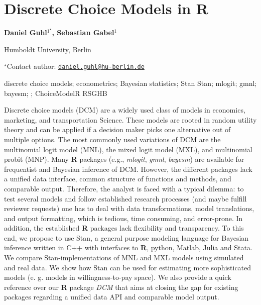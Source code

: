 \documentclass[\main/boa.tex]{subfiles}
\begin{document}
\section{Discrete Choice Models in R}

\begin{center}
  {\bf {} Daniel Guhl$^{1^\star}$,  Sebastian Gabel$^{1}$}
\end{center}

\vskip 0.3cm

\begin{affiliations}
\begin{enumerate}
\begin{minipage}{0.915\textwidth}
\centering
\item Humboldt University, Berlin \\[-2pt]
\end{minipage}
\end{enumerate}
$^\star$Contact author: \href{mailto:daniel.guhl@hu-berlin.de}{\nolinkurl{daniel.guhl@hu-berlin.de}}\\
\end{affiliations}

\vskip 0.5cm

\begin{minipage}{0.915\textwidth}
\keywords discrete choice models; econometrics; Bayesian statistics; Stan
\packages {} Stan;  mlogit;  gmnl;  bayesm; ; ChoiceModelR  RSGHB
\end{minipage}

\vskip 0.8cm

Discrete choice models (DCM) are a widely used class of models in
economics, marketing, and transportation Science. These models are
rooted in random utility theory and can be applied if a decision maker
picks one alternative out of multiple options. The most commonly used
variations of DCM are the multinomial logit model (MNL), the mixed logit
model (MXL), and multinomial probit (MNP). Many \textbf{R} packages
(e.g., \emph{mlogit}, \emph{gmnl}, \emph{bayesm}) are available for
frequentist and Bayesian inference of DCM. However, the different
packages lack a unified data interface, common structure of functions
and methods, and comparable output. Therefore, the analyst is faced with
a typical dilemma: to test several models and follow established
research processes (and maybe fulfill reviewer requests) one has to deal
with data transformations, model translations, and output formatting,
which is tedious, time consuming, and error-prone. In addition, the
established \textbf{R} packages lack flexibility and transparency. To
this end, we propose to use Stan, a general purpose modeling language
for Bayesian inference written in C++ with interfaces to \textbf{R},
python, Matlab, Julia and Stata. We compare Stan-implementations of MNL
and MXL models using simulated and real data. We show how Stan can be
used for estimating more sophisticated models (e. g. models in
willingness-to-pay space). We also provide a quick reference over our
\textbf{R} package \emph{DCM} that aims at closing the gap for existing
packages regarding a unified data API and comparable model output.
\end{document}
